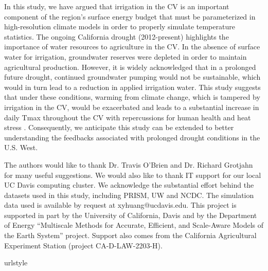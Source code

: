 \documentclass[draft,ms]{agutex}   %
\begin{document}
\begin{article}
In this study, we have argued that irrigation in the CV is an important component of the region's surface energy budget that must be parameterized in high-resolution climate models in order to properly simulate temperature statistics. The ongoing California drought (2012-present) highlights the importance of water resources to agriculture in the CV. In the absence of surface water for irrigation, groundwater reserves were depleted in order to maintain agricultural production.  However, it is widely acknowledged that in a prolonged future drought, continued groundwater pumping would not be sustainable, which would in turn lead to a reduction in applied irrigation water.  This study suggests that under these conditions, warming from climate change, which is tampered by irrigation in the CV, would be exacerbated and leads to a substantial increase in daily Tmax throughout the CV with repercussions for human health and heat stress \citep{williams2015contribution}. Consequently, we anticipate this study can be extended to better understanding the feedbacks associated with prolonged drought conditions in the U.S. West.

\begin{acknowledgments}

The authors would like to thank Dr. Travis O'Brien and Dr. Richard Grotjahn for many useful suggestions. We would also like to thank IT support for our local UC Davis computing cluster. We acknowledge the substantial effort behind the datasets used in this study, including PRISM, UW and NCDC. The simulation data used is available by request at xyhuang@ucdavis.edu. This project is supported in part by the University of California, Davis and by the Department of Energy ``Multiscale Methods for Accurate, Efficient, and Scale-Aware Models of the Earth System'' project. Support also comes from the California Agricultural Experiment Station (project CA-D-LAW-2203-H). 

\end{acknowledgments}

%
%


\begin{thebibliography}{43}
\providecommand{\natexlab}[1]{#1}
\expandafter\ifx\csname urlstyle\endcsname\relax
  \providecommand{\doi}[1]{doi:\discretionary{}{}{}#1}\else
  \providecommand{\doi}{doi:\discretionary{}{}{}\begingroup
  \urlstyle{rm}\Url}\fi


\end{thebibliography}
\end{article}
\end{document}
